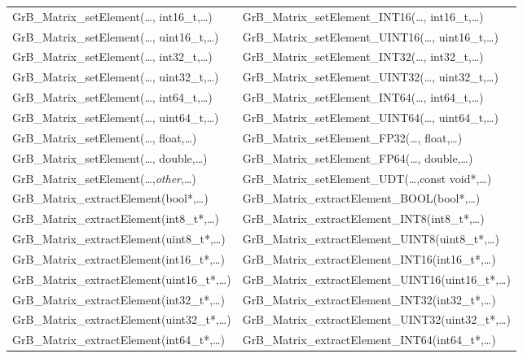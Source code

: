 \begin{table}[htb]
{\begin{tabular}{l|l}
{\sf GrB\_Matrix\_setElement(\ldots, int16\_t,\ldots)}		& {\sf GrB\_Matrix\_setElement\_INT16(\ldots, int16\_t,\ldots)} \\
{\sf GrB\_Matrix\_setElement(\ldots, uint16\_t,\ldots)}		& {\sf GrB\_Matrix\_setElement\_UINT16(\ldots, uint16\_t,\ldots)} \\
{\sf GrB\_Matrix\_setElement(\ldots, int32\_t,\ldots)}		& {\sf GrB\_Matrix\_setElement\_INT32(\ldots, int32\_t,\ldots)} \\
{\sf GrB\_Matrix\_setElement(\ldots, uint32\_t,\ldots)}		& {\sf GrB\_Matrix\_setElement\_UINT32(\ldots, uint32\_t,\ldots)} \\
{\sf GrB\_Matrix\_setElement(\ldots, int64\_t,\ldots)}		& {\sf GrB\_Matrix\_setElement\_INT64(\ldots, int64\_t,\ldots)} \\
{\sf GrB\_Matrix\_setElement(\ldots, uint64\_t,\ldots)}		& {\sf GrB\_Matrix\_setElement\_UINT64(\ldots, uint64\_t,\ldots)} \\
{\sf GrB\_Matrix\_setElement(\ldots, float,\ldots)}		& {\sf GrB\_Matrix\_setElement\_FP32(\ldots, float,\ldots)} \\
{\sf GrB\_Matrix\_setElement(\ldots, double,\ldots)}		& {\sf GrB\_Matrix\_setElement\_FP64(\ldots, double,\ldots)} \\
{\sf GrB\_Matrix\_setElement(\ldots,\emph{other},\ldots)}	& {\sf GrB\_Matrix\_setElement\_UDT(\ldots,const void*,\ldots)} \\ \hline
{\sf GrB\_Matrix\_extractElement(bool*,\ldots)}			& {\sf GrB\_Matrix\_extractElement\_BOOL(bool*,\ldots)} \\
{\sf GrB\_Matrix\_extractElement(int8\_t*,\ldots)}		& {\sf GrB\_Matrix\_extractElement\_INT8(int8\_t*,\ldots)} \\
{\sf GrB\_Matrix\_extractElement(uint8\_t*,\ldots)}		& {\sf GrB\_Matrix\_extractElement\_UINT8(uint8\_t*,\ldots)} \\
{\sf GrB\_Matrix\_extractElement(int16\_t*,\ldots)}		& {\sf GrB\_Matrix\_extractElement\_INT16(int16\_t*,\ldots)} \\
{\sf GrB\_Matrix\_extractElement(uint16\_t*,\ldots)}		& {\sf GrB\_Matrix\_extractElement\_UINT16(uint16\_t*,\ldots)} \\
{\sf GrB\_Matrix\_extractElement(int32\_t*,\ldots)}		& {\sf GrB\_Matrix\_extractElement\_INT32(int32\_t*,\ldots)} \\
{\sf GrB\_Matrix\_extractElement(uint32\_t*,\ldots)}		& {\sf GrB\_Matrix\_extractElement\_UINT32(uint32\_t*,\ldots)} \\
{\sf GrB\_Matrix\_extractElement(int64\_t*,\ldots)}		& {\sf GrB\_Matrix\_extractElement\_INT64(int64\_t*,\ldots)} \\

\end{tabular}}
\end{table}
